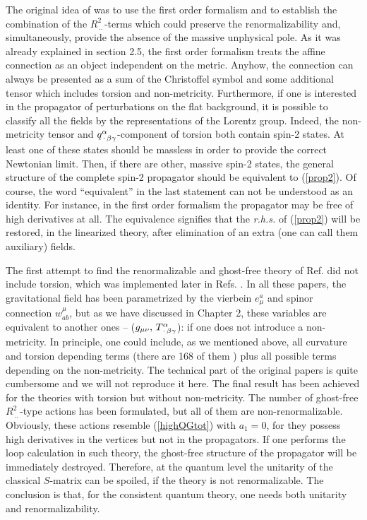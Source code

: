 The original idea of \cite{nev1} was to use the first order formalism
and to establish the combination 
of the $R^2_{\,..\,}$-terms which could preserve the renormalizability 
and, simultaneously, provide the absence of the massive unphysical
pole. As it was already explained in section 2.5, the first order 
formalism treats the affine connection as an object independent 
on the metric. Anyhow, the connection can always be  
presented as a sum of the Christoffel symbol and some additional 
tensor which includes torsion and non-metricity. Furthermore,
if one is interested in the propagator of perturbations on 
the flat background, it is possible to classify all the fields by 
the representations of the Lorentz group. Indeed, the non-metricity 
tensor and $q^\alpha_{\,\cdot\,\beta\gamma}$-component of torsion both
contain spin-2 states. At least one of these 
states should be massless in order to provide the correct Newtonian 
limit. Then, if there are other, massive spin-2 states, the 
general structure of the complete spin-2 propagator should be 
equivalent to (\ref{prop2}). Of course, the word ``equivalent''
in the last statement can not be understood as an identity.  
For instance, in the first order formalism 
the propagator may be free of high derivatives at all. The 
equivalence signifies that the {\it r.h.s.} of (\ref{prop2})
will be restored, in the linearized theory, after elimination
of an extra (one can call them auxiliary) fields. 

The first attempt to find the renormalizable and ghost-free
theory of Ref. \cite{nev1} did not include torsion, which was  
implemented later in Refs. \cite{nev2,seznie,sez,nev3}. 
In all these papers, the gravitational field has been 
parametrized by the vierbein $e_\mu^a$ and spinor connection
$w^\mu_{ab}$, but as we have discussed in Chapter 2, 
these variables are equivalent to another ones -- 
($g_{\mu\nu},\,T^\alpha_{\,\cdot\,\beta\gamma}$): if one does not 
introduce a non-metricity. 
In principle, one could include, as we mentioned above, all 
curvature and torsion depending terms (there are 168 of them
\cite{chris}) plus all possible terms depending on the 
non-metricity. The technical part of the original papers 
\cite{nev1,nev2,seznie,sez} is quite cumbersome and we 
will not reproduce it here. The final result has been achieved 
for the theories with torsion but without non-metricity. The 
number of ghost-free $R^2_{\,..\,}$-type actions has been 
formulated, but all of them 
are non-renormalizable. Obviously, these actions resemble 
(\ref{highQGtot}) with $a_1=0$, for they possess high 
derivatives in the vertices but not in the propagators. 
If one performs the loop calculation in such theory, 
the ghost-free structure of the propagator will be immediately 
destroyed. Therefore, at the quantum level the unitarity of 
the classical $S$-matrix can be spoiled, if the theory is 
not renormalizable. The conclusion is that, for the consistent
quantum theory, one needs both unitarity and renormalizability.
  
